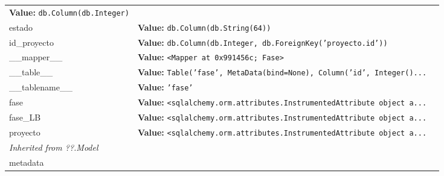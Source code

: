 \begin{longtable}{|p{\varnamewidth}|p{\vardescrwidth}|l}
\textbf{Value:} 
{\tt db.Column(db.Integer)}&\\
\cline{1-2}
\raggedright e\-s\-t\-a\-d\-o\- & \raggedright \textbf{Value:} 
{\tt db.Column(db.String(64))}&\\
\cline{1-2}
\raggedright i\-d\-\_\-p\-r\-o\-y\-e\-c\-t\-o\- & \raggedright \textbf{Value:} 
{\tt db.Column(db.Integer, db.ForeignKey('proyecto.id'))}&\\
\cline{1-2}
\raggedright \_\-\_\-m\-a\-p\-p\-e\-r\-\_\-\_\- & \raggedright \textbf{Value:} 
{\tt {\textless}Mapper at 0x991456c; Fase{\textgreater}}&\\
\cline{1-2}
\raggedright \_\-\_\-t\-a\-b\-l\-e\-\_\-\_\- & \raggedright \textbf{Value:} 
{\tt Table('fase', MetaData(bind=None), Column('id', Integer()\texttt{...}}&\\
\cline{1-2}
\raggedright \_\-\_\-t\-a\-b\-l\-e\-n\-a\-m\-e\-\_\-\_\- & \raggedright \textbf{Value:} 
{\tt \texttt{'}\texttt{fase}\texttt{'}}&\\
\cline{1-2}
\raggedright f\-a\-s\-e\- & \raggedright \textbf{Value:} 
{\tt {\textless}sqlalchemy.orm.attributes.InstrumentedAttribute object a\texttt{...}}&\\
\cline{1-2}
\raggedright f\-a\-s\-e\-\_\-L\-B\- & \raggedright \textbf{Value:} 
{\tt {\textless}sqlalchemy.orm.attributes.InstrumentedAttribute object a\texttt{...}}&\\
\cline{1-2}
\raggedright p\-r\-o\-y\-e\-c\-t\-o\- & \raggedright \textbf{Value:} 
{\tt {\textless}sqlalchemy.orm.attributes.InstrumentedAttribute object a\texttt{...}}&\\
\cline{1-2}
\multicolumn{2}{|l|}{\textit{Inherited from ??.Model}}\\
\multicolumn{2}{|p{\varwidth}|}{\raggedright metadata}\\
\cline{1-2}
\end{longtable}

